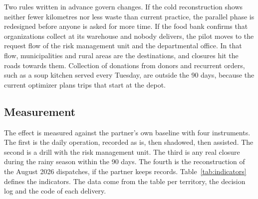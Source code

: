 \documentclass[11pt]{article}
\begin{document}
Two rules written in advance govern changes. If the cold reconstruction shows neither fewer kilometres nor less waste than current practice, the parallel phase is redesigned before anyone is asked for more time. If the food bank confirms that organizations collect at its warehouse and nobody delivers, the pilot moves to the request flow of the risk management unit and the departmental office. In that flow, municipalities and rural areas are the destinations, and closures hit the roads towards them. Collection of donations from donors and recurrent orders, such as a soup kitchen served every Tuesday, are outside the 90 days, because the current optimizer plans trips that start at the depot.

\subsection{Measurement}

The effect is measured against the partner's own baseline with four instruments. The first is the daily operation, recorded as is, then shadowed, then assisted. The second is a drill with the risk management unit. The third is any real closure during the rainy season within the 90 days. The fourth is the reconstruction of the August 2026 dispatches, if the partner keeps records. Table~\ref{tab:indicators} defines the indicators. The data come from the table per territory, the decision log and the code of each delivery.
\end{document}
